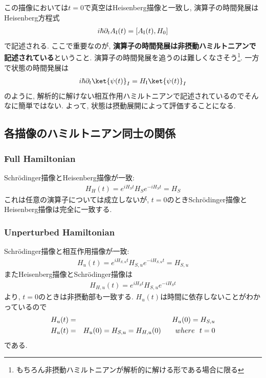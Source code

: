 \documentclass[10.5pt,a4paper]{jreport}
\begin{document}
この描像においては$t = 0$で真空はHeisenberg描像と一致し, 演算子の時間発展はHeisenberg方程式
\begin{eqnarray}
  i\hbar\partial_tA_{\rm I}(t) = [A_{\rm I}(t), H_0]
\end{eqnarray}
で記述される. ここで重要なのが, \textbf{演算子の時間発展は非摂動ハミルトニアンで記述されている}ということ. 演算子の時間発展を追うのは難しくなさそう\footnote{もちろん非摂動ハミルトニアンが解析的に解ける形である場合に限る}. 一方で状態の時間発展は
\begin{eqnarray}
  i\hbar\partial_t\ket{\psi(t)}_I = H_{\rm I}\ket{\psi(t)}_I
\end{eqnarray}
のように, 解析的に解けない相互作用ハミルトニアンで記述されているのでそんなに簡単ではない. よって, 状態は摂動展開によって評価することになる.
\subsection{各描像のハミルトニアン同士の関係}
\subsubsection{Full Hamiltonian}
Schr\"odinger描像とHeisenberg描像が一致:
\begin{eqnarray}
  H_H(t) = e^{iH_St}H_Se^{-iH_St} = H_S
\end{eqnarray}
これは任意の演算子については成立しないが, $t = 0$のときSchr\"odinger描像とHeisenberg描像は完全に一致する.
\subsubsection{Unperturbed Hamiltonian}
Schr\"odinger描像と相互作用描像が一致:
\begin{eqnarray}
  H_u(t) = e^{iH_{S, u}t}H_{S, u}e^{-iH_{S, u}t} = H_{S, u}
\end{eqnarray}
またHeisenberg描像とSchr\"odinger描像は
\begin{eqnarray}
  H_{H, u}(t) = e^{iH_St}H_{S, u}e^{-iH_St}
\end{eqnarray}
より, $t = 0$のときは非摂動部も一致する. $H_u(t)$は時間に依存しないことがわかっているので
\begin{eqnarray}
  H_u(t) &=& H_u(0) = H_{S, u}\\
  H_u(t) &=& H_u(0) = H_{S, u} = H_{H, u}(0)\hspace{0.7cm} where\ \ t = 0
\end{eqnarray}
である.
\end{document}
